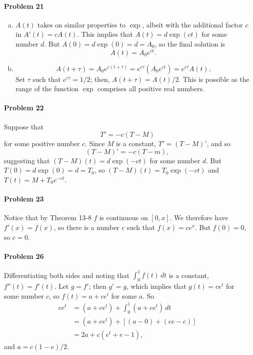\documentclass{article}
\begin{document}
\paragraph{Problem 21}
\begin{enumerate}[(a)]
  \item $A(t)$ takes on similar properties to $\exp$, albeit with the
    additional factor $c$ in $A'(t) = cA(t)$. This implies that $A(t) =
    d\exp(ct)$ for some number $d$. But $A(0) = d\exp(0) = d = A_0$, so the
    final solution is \[ A(t) = A_0e^{ct}. \]
  \item \[
      A(t + \tau) = A_0e^{c(t + \tau)} = e^{c\tau}(A_0e^{ct}) = e^{c\tau}A(t).
    \] Set $\tau$ such that $e^{c\tau} = 1/2$; then, $A(t + \tau) = A(t)/2$.
    This is possible as the range of the function $\exp$ comprises all positive
    real numbers.
\end{enumerate}

\paragraph{Problem 22} Suppose that \[ T' = -c(T - M) \] for some positive
number $c$. Since $M$ is a constant, $T' = (T - M)'$, and so \[ (T - M)' =
-c(T - m), \] suggesting that $(T - M)(t) = d\exp(-ct)$ for some number $d$.
But $T(0) = d\exp(0) = d = T_0$, so $(T - M)(t) = T_0\exp(-ct)$ and $T(t) = M +
T_0e^{-ct}$.

\paragraph{Problem 23} Notice that by Theorem 13-8 $f$ is continuous on $[0,
x]$. We therefore have $f'(x) = f(x)$, so there is a number $c$ such that $f(x)
= ce^x$. But $f(0) = 0$, so $c = 0$.

\paragraph{Problem 26} Differentiating both sides and noting that $\int_0^1
f(t) \,dt$ is a constant, $f''(t) = f'(t)$. Let $g = f'$; then $g' = g$, which
implies that $g(t) = ce^t$ for some number $c$, so $f(t) = a + ce^t$ for some
$a$. So
\begin{align*}
  ce^t &= (a + ce^t) + \int_0^1 (a + ce^t) \,dt \\
       &= (a + ce^t) + [(a - 0) + (ce - c)] \\
       &= 2a + c(e^t + e - 1),
\end{align*}
and $a = c(1 - e)/2$.
\end{document}

